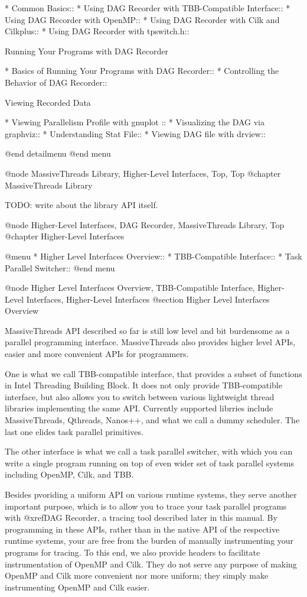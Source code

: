 * Common Basics::
* Using DAG Recorder with TBB-Compatible Interface::
* Using DAG Recorder with OpenMP::
* Using DAG Recorder with Cilk and Cilkplus::
* Using DAG Recorder with tpswitch.h::

Running Your Programs with DAG Recorder

* Basics of Running Your Programs with DAG Recorder::
* Controlling the Behavior of DAG Recorder::

Viewing Recorded Data

* Viewing Parallelism Profile with gnuplot ::
* Visualizing the DAG via graphviz::
* Understanding Stat File::
* Viewing DAG file with drview::

@end detailmenu
@end menu

@node MassiveThreads Library, Higher-Level Interfaces, Top, Top
@chapter MassiveThreads Library

TODO: write about the library API itself.

@node Higher-Level Interfaces, DAG Recorder, MassiveThreads Library, Top
@chapter Higher-Level Interfaces

@menu
* Higher Level Interfaces Overview::
* TBB-Compatible Interface::
* Task Parallel Switcher::
@end menu

@node Higher Level Interfaces Overview, TBB-Compatible Interface, Higher-Level Interfaces, Higher-Level Interfaces
@section Higher Level Interfaces Overview

MassiveThreads API described so far is still low level and bit
burdensome as a parallel programming interface.  MassiveThreads also
provides higher level APIs, easier and more convenient APIs for
programmers.

One is what we call TBB-compatible interface, that provides a subset of
functions in Intel Threading Building Block.  It does not only provide
TBB-compatible interface, but also allows you to switch between various
lightweight thread libraries implementing the same API.  Currently
supported librries include MassiveThreads, Qthreads, Nanos++, and what
we call a dummy scheduler.  The last one elides task parallel primitives.

The other interface is what we call a task parallel switcher, with which
you can write a single program running on top of even wider set of task
parallel systems including OpenMP, Cilk, and TBB.  

Besides pvoriding a uniform API on various runtime systems, they serve
another important purpose, which is to allow you to trace your task
parallel programs with @xref{DAG Recorder}, a tracing tool described
later in this manual.  By programming in these APIs, rather than in the
native API of the respective runtime systems, your are free from the
burden of manually instrumenting your programs for tracing.  To this
end, we also provide headers to facilitate instrumentation of OpenMP and
Cilk.  They do not serve any purpose of making OpenMP and Cilk more
convenient nor more uniform; they simply make instrumenting OpenMP and
Cilk easier.

